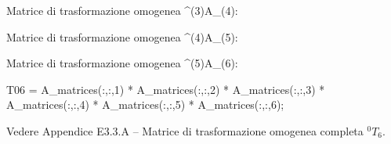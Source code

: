 \documentclass[11pt, a4paper]{article}
\begin{document}
\begin{matlaboutput}
Matrice di trasformazione omogenea ^(3)A_(4):
\end{matlaboutput}
\begin{matlaboutput}
Matrice di trasformazione omogenea ^(4)A_(5):
\end{matlaboutput}
\begin{matlaboutput}
Matrice di trasformazione omogenea ^(5)A_(6):
\end{matlaboutput}
\begin{matlabcode}
T06 = A_matrices(:,:,1) * A_matrices(:,:,2) * A_matrices(:,:,3) * A_matrices(:,:,4) * A_matrices(:,:,5) * A_matrices(:,:,6);
\end{matlabcode}

\begin{par}
\begin{flushleft}
Vedere Appendice E3.3.A -- Matrice di trasformazione omogenea completa ${}^{0}T_{6}$.
\end{flushleft}
\end{par}
\end{document}

